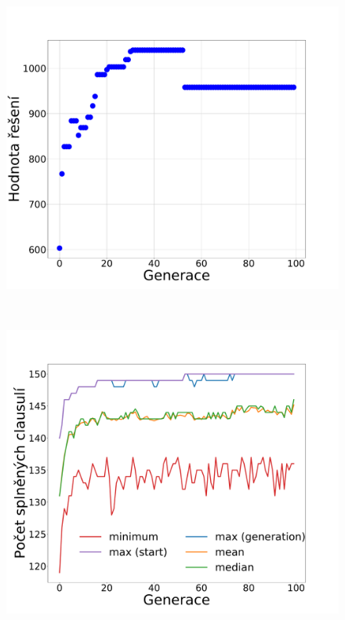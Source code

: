 \documentclass[11pt]{article}
\begin{document}
\begin{figure}
\begin{minipage}[c]{0.325\textwidth}
    \end{minipage}
    \begin{minipage}[c]{0.325\textwidth}
        \centering \includegraphics[width=\textwidth]{img/1w.pdf} 
    \end{minipage}
    \\
    \begin{minipage}[c]{0.49\textwidth}
        \centering \includegraphics[width=\textwidth]{img/1c.pdf} 
    \end{minipage}

\end{figure}
\end{document}

